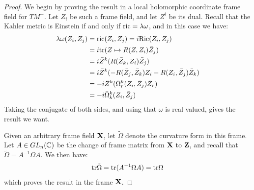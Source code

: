\begin{proof}
We begin by proving the result in a local holomorphic coordinate frame field for $TM^{+}$.  Let $Z_i$ be such a frame field, and let $Z^i$ be its dual.  Recall that the Kahler metric is Einstein if and only if $\text{ric} = \lambda \omega$, and in this case we have:
%
\begin{align*}
\lambda \omega( Z_i, \bar{Z}_j ) &= \text{ric} ( Z_i, \bar{Z}_j ) = i \text{Ric}( Z_i, \bar{Z}_j ) \\
&= i  \text{tr} ( Z \mapsto R( Z, Z_i ) \bar{Z}_j ) \\
&= i \bar{Z}^k ( R( \bar{Z}_k, Z_i ) \bar{Z}_j ) \\
&= i \bar{Z}^k ( - R( \bar{Z}_j, \bar{Z}_k ) Z_i - R( Z_i, \bar{Z}_j ) \bar{Z}_k ) \\
&= - i \bar{Z}^k ( \bar{\Omega}^k_r ( Z_i, \bar{Z}_j ) \bar{Z}_r ) \\
&= - i \bar{\Omega}^k_k ( Z_i, \bar{Z}_j )
\end{align*}
%
Taking the conjugate of both sides, and using that $\omega$ is real valued, gives the result we want.

Given an arbitrary frame field $\mathbf{X}$, let $\tilde{ \Omega }$ denote the curvature form in this frame.  Let $A \in GL_n( \mathbb{C} )$ be the change of frame matrix from $\mathbf{X}$ to $\mathbf{Z}$, and recall that $\tilde{ \Omega } = A^{-1} \Omega A$.  We then have:
%
$$ \text{tr} \tilde{ \Omega } = \text{tr} ( A^{-1} \Omega A ) = \text{tr} \Omega $$
%
which proves the result in the frame $\mathbf{X}$.
%
\end{proof}
